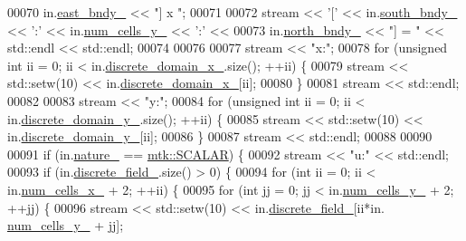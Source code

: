 \begin{DoxyCode}
00070   in.\hyperlink{classmtk_1_1UniStgGrid2D_ae24f3d5bf5ed3a6d066cdf48aa1fb307}{east\_bndy\_} << \textcolor{stringliteral}{"] x "};
00071 
00072   stream << \textcolor{charliteral}{'['} << in.\hyperlink{classmtk_1_1UniStgGrid2D_ac228c81fad7f4feeae93fb3c09d7e175}{south\_bndy\_} << \textcolor{charliteral}{':'} << in.\hyperlink{classmtk_1_1UniStgGrid2D_a3e4f61d781212ad57c34e9446c4074b6}{num\_cells\_y\_} << \textcolor{charliteral}{':'} <<
00073   in.\hyperlink{classmtk_1_1UniStgGrid2D_a3f904091b6e74aa78d8543e5cba26afb}{north\_bndy\_} << \textcolor{stringliteral}{"] = "} << std::endl << std::endl;
00074 
00076 
00077   stream << \textcolor{stringliteral}{"x:"};
00078   \textcolor{keywordflow}{for} (\textcolor{keywordtype}{unsigned} \textcolor{keywordtype}{int} ii = 0; ii < in.\hyperlink{classmtk_1_1UniStgGrid2D_ab15979865852583a46662ea592f27a4f}{discrete\_domain\_x\_}.size(); ++ii) \{
00079     stream << std::setw(10) << in.\hyperlink{classmtk_1_1UniStgGrid2D_ab15979865852583a46662ea592f27a4f}{discrete\_domain\_x\_}[ii];
00080   \}
00081   stream << std::endl;
00082 
00083   stream << \textcolor{stringliteral}{"y:"};
00084   \textcolor{keywordflow}{for} (\textcolor{keywordtype}{unsigned} \textcolor{keywordtype}{int} ii = 0; ii < in.\hyperlink{classmtk_1_1UniStgGrid2D_ad69f93d4b27707d97f209b907383a7a2}{discrete\_domain\_y\_}.size(); ++ii) \{
00085     stream << std::setw(10) << in.\hyperlink{classmtk_1_1UniStgGrid2D_ad69f93d4b27707d97f209b907383a7a2}{discrete\_domain\_y\_}[ii];
00086   \}
00087   stream << std::endl;
00088 
00090 
00091   \textcolor{keywordflow}{if} (in.\hyperlink{classmtk_1_1UniStgGrid2D_ac8b66740d328803f7fbabd1c42c775b2}{nature\_} == \hyperlink{namespacemtk_ga4c54f2a329cfb4e56213b02a259d19e2af481d45bd70d41381c7d72e200889205}{mtk::SCALAR}) \{
00092     stream << \textcolor{stringliteral}{"u:"} << std::endl;
00093     \textcolor{keywordflow}{if} (in.\hyperlink{classmtk_1_1UniStgGrid2D_ad7474b2669ee988b84aed20b7f5dc7be}{discrete\_field\_}.size() > 0) \{
00094       \textcolor{keywordflow}{for} (\textcolor{keywordtype}{int} ii = 0; ii < in.\hyperlink{classmtk_1_1UniStgGrid2D_ac03a0f4840ee6ae1bc853e5d9c0df8d1}{num\_cells\_x\_} + 2; ++ii) \{
00095         \textcolor{keywordflow}{for} (\textcolor{keywordtype}{int} jj = 0; jj < in.\hyperlink{classmtk_1_1UniStgGrid2D_a3e4f61d781212ad57c34e9446c4074b6}{num\_cells\_y\_} + 2; ++jj) \{
00096           stream << std::setw(10) << in.\hyperlink{classmtk_1_1UniStgGrid2D_ad7474b2669ee988b84aed20b7f5dc7be}{discrete\_field\_}[ii*in.
      \hyperlink{classmtk_1_1UniStgGrid2D_a3e4f61d781212ad57c34e9446c4074b6}{num\_cells\_y\_} + jj];

\end{DoxyCode}
